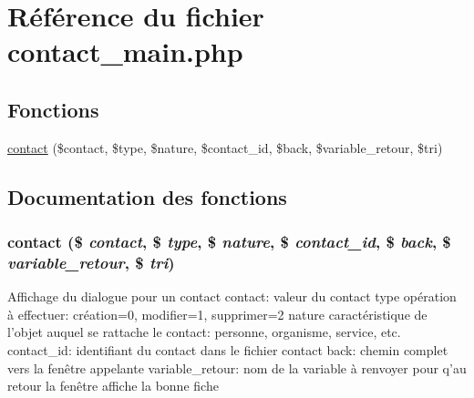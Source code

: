 \hypertarget{contact__main_8php}{
\section{R\'{e}f\'{e}rence du fichier contact\_\-main.php}
\label{contact__main_8php}
}
\subsection*{Fonctions}
\begin{CompactItemize}
\item 
\hyperlink{contact__main_8php_a0}{contact} (\$contact, \$type, \$nature, \$contact\_\-id, \$back, \$variable\_\-retour, \$tri)
\end{CompactItemize}


\subsection{Documentation des fonctions}
\hypertarget{contact__main_8php_a0}{
\subsubsection[contact]{\setlength{\rightskip}{0pt plus 5cm}contact (\$ {\em contact}, \$ {\em type}, \$ {\em nature}, \$ {\em contact\_\-id}, \$ {\em back}, \$ {\em variable\_\-retour}, \$ {\em tri})}}
\label{contact__main_8php_a0}


Affichage du dialogue pour un contact contact: valeur du contact type op\'{e}ration \`{a} effectuer: cr\'{e}ation=0, modifier=1, supprimer=2 nature caract\'{e}ristique de l'objet auquel se rattache le contact: personne, organisme, service, etc. contact\_\-id: identifiant du contact dans le fichier contact back: chemin complet vers la fen\^{e}tre appelante variable\_\-retour: nom de la variable \`{a} renvoyer pour q'au retour la fen\^{e}tre affiche la bonne fiche 